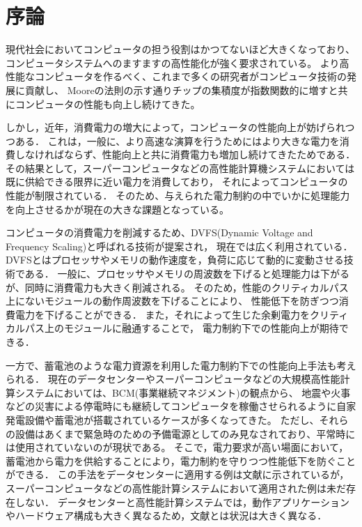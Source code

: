 \chapter{序論}

現代社会においてコンピュータの担う役割はかつてないほど大きくなっており、
コンピュータシステムへのますますの高性能化が強く要求されている。
より高性能なコンピュータを作るべく、これまで多くの研究者がコンピュータ技術の発展に貢献し、
Mooreの法則\cite{mooreslaw}の示す通りチップの集積度が指数関数的に増すと共にコンピュータの性能も向上し続けてきた。



しかし，近年，消費電力の増大によって，コンピュータの性能向上が妨げられつつある．
これは，一般に、より高速な演算を行うためにはより大きな電力を消費しなければならず、性能向上と共に消費電力も増加し続けてきたためである．
その結果として，スーパーコンピュータなどの高性能計算機システムにおいては既に供給できる限界に近い電力を消費しており，
それによってコンピュータの性能が制限されている．
そのため、与えられた電力制約の中でいかに処理能力を向上させるかが現在の大きな課題となっている。


コンピュータの消費電力を削減するため、DVFS(Dynamic Voltage and Frequency Scaling)と呼ばれる技術が提案され，
現在では広く利用されている．DVFSとはプロセッサやメモリの動作速度を，負荷に応じて動的に変動させる技術である．
一般に、プロセッサやメモリの周波数を下げると処理能力は下がるが、同時に消費電力も大きく削減される。
そのため，性能のクリティカルパス上にないモジュールの動作周波数を下げることにより、
性能低下を防ぎつつ消費電力を下げることができる．
また，それによって生じた余剰電力をクリティカルパス上のモジュールに融通することで，
電力制約下での性能向上が期待できる．



一方で、蓄電池のような電力資源を利用した電力制約下での性能向上手法も考えられる．
現在のデータセンターやスーパーコンピュータなどの大規模高性能計算システムにおいては、BCM(事業継続マネジメント)の観点から、
地震や火事などの災害による停電時にも継続してコンピュータを稼働させられるように自家発電設備や蓄電池が搭載されているケースが多くなってきた。
ただし、それらの設備はあくまで緊急時のための予備電源としてのみ見なされており、平常時には使用されていないのが現状である。
そこで，電力要求が高い場面において，蓄電池から電力を供給することにより，電力制約を守りつつ性能低下を防ぐことができる．
この手法をデータセンターに適用する例は文献\cite{Govindan:2011:BLT:2024723.2000105}に示されているが，
スーパーコンピュータなどの高性能計算システムにおいて適用された例は未だ存在しない．
データセンターと高性能計算システムでは，動作アプリケーションやハードウェア構成も大きく異なるため，文献\cite{Govindan:2011:BLT:2024723.2000105}とは状況は大きく異なる．


